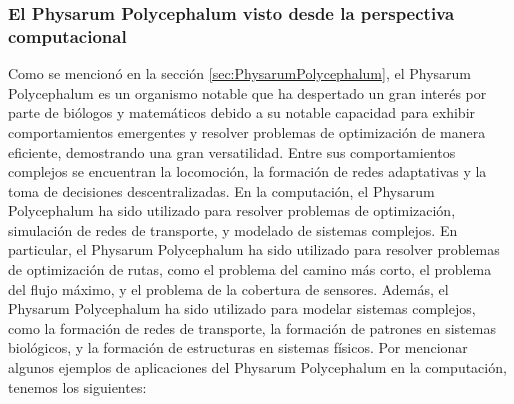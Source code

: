 \subsubsection{El Physarum Polycephalum visto desde la perspectiva computacional}
    Como se mencion\'o en la secci\'on \ref{sec:PhysarumPolycephalum}, el Physarum Polycephalum es un organismo notable 
        que ha despertado un gran inter\'es por parte de bi\'ologos y matem\'aticos debido a su notable capacidad para exhibir comportamientos 
        emergentes y resolver problemas de optimizaci\'on de manera eficiente, demostrando una gran versatilidad. Entre sus comportamientos 
        complejos se encuentran la locomoci\'on, la formaci\'on de redes adaptativas y la toma de decisiones descentralizadas.
    \vskip 0.5cm
    En la computaci\'on, el Physarum Polycephalum ha sido utilizado para resolver problemas de optimizaci\'on, 
        simulaci\'on de redes de transporte, y modelado de sistemas complejos. En particular, el Physarum Polycephalum
        ha sido utilizado para resolver problemas de optimizaci\'on de rutas, como el problema del camino m\'as corto,
        el problema del flujo m\'aximo, y el problema de la cobertura de sensores. Adem\'as, el Physarum Polycephalum
        ha sido utilizado para modelar sistemas complejos, como la formaci\'on de redes de transporte, la formaci\'on
        de patrones en sistemas biol\'ogicos, y la formaci\'on de estructuras en sistemas f\'isicos.
    \vskip 0.5cm
    Por mencionar algunos ejemplos de aplicaciones del Physarum Polycephalum en la computaci\'on, tenemos los siguientes:
